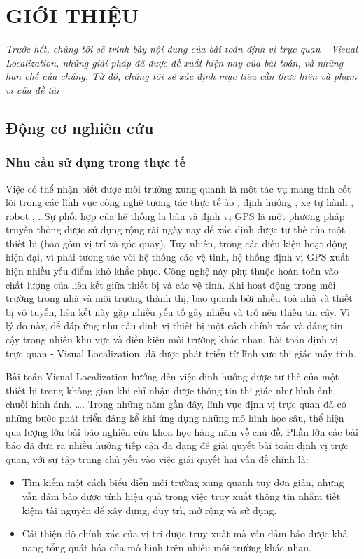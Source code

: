 \chapter{GIỚI THIỆU}

\textit{Trước hết, chúng tôi sẽ trình bày nội dung của bài toán định vị trực quan - Visual Localization, những giải pháp đã được đề xuất hiện nay của bài toán, và những hạn chế của chúng. Từ đó, chúng tôi sẽ xác định mục tiêu cần thực hiện và phạm vi của đề tài}

\section{Động cơ nghiên cứu}

\subsection{Nhu cầu sử dụng trong thực tế}

Việc có thể nhận biết được môi trường xung quanh là một tác vụ mang tính cốt lõi trong các lĩnh vực công nghệ tương tác thực tế ảo \cite{middelberg2014scalable}, định hướng \cite{sarlin2023orienternet}, xe tự hành \cite{chaabane2021end}, robot \cite{sunderhauf2015place}, \dots Sự phối hợp của hệ thống la bàn và định vị GPS là một phương pháp truyền thống được sử dụng rộng rãi ngày nay để xác định được tư thế của một thiết bị (bao gồm vị trí và góc quay). Tuy nhiên, trong các điều kiện hoạt động hiện đại, vì phải tương tác với hệ thống các vệ tinh, hệ thống định vị GPS xuất hiện nhiều yếu điểm khó khắc phục. Công nghệ này phụ thuộc hoàn toàn vào chất lượng của liên kết giữa thiết bị và các vệ tinh. Khi hoạt động trong môi trường trong nhà và môi trường thành thị, bao quanh bởi nhiều toà nhà và thiết bị vô tuyến, liên kết này gặp nhiều yếu tố gây nhiễu và trở nên thiếu tin cậy. Vì lý do này, để đáp ứng nhu cầu định vị thiết bị một cách chính xác và đáng tin cậy trong nhiều khu vực và điều kiện môi trường khác nhau, bài toán định vị trực quan - Visual Localization, đã được phát triển từ lĩnh vực thị giác máy tính.

Bài toán Visual Localization hướng đến việc định hướng được tư thế của một thiết bị trong không gian khi chỉ nhận được thông tin thị giác như hình ảnh, chuỗi hình ảnh, \dots. Trong những năm gần đây, lĩnh vực định vị trực quan đã có những bước phát triển đáng kể khi ứng dụng những mô hình học sâu, thể hiện qua lượng lớn bài báo nghiên cứu khoa học hàng năm về chủ đề. Phần lớn các bài báo đã đưa ra nhiều hướng tiếp cận đa dạng để giải quyết bài toán định vị trực quan, với sự tập trung chủ yếu vào việc giải quyết hai vấn đề chính là:
\begin{itemize}
  \item Tìm kiếm một cách biểu diễn môi trường xung quanh tuy đơn giản, nhưng vẫn đảm bảo được tính hiệu quả trong việc truy xuất thông tin nhằm tiết kiệm tài nguyên để xây dựng, duy trì, mở rộng và sử dụng.
  \item Cải thiện độ chính xác của vị trí được truy xuất mà vẫn đảm bảo được khả năng tổng quát hóa của mô hình trên nhiều môi trường khác nhau.
\end{itemize}

